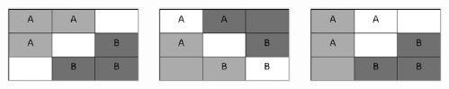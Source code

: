 \documentclass[red]{beamer}
\begin{document}
\begin{frame} [t]
\begin{columns}
\begin{column}{0.15\textwidth}
    \end{column}
    \begin{column}{0.15\textwidth}
    \includegraphics[scale = .25]{Symm_1_3.png}
    \end{column}
    \begin{column}{0.15\textwidth}
    \includegraphics[scale = .25]{Symm_3_1.png}
    \end{column}
    \begin{column}{0.15\textwidth}
    \includegraphics[scale = .25]{Gerry_A.png}
    \end{column}
    \end{columns}
    \end{frame}
    
\end{document}
